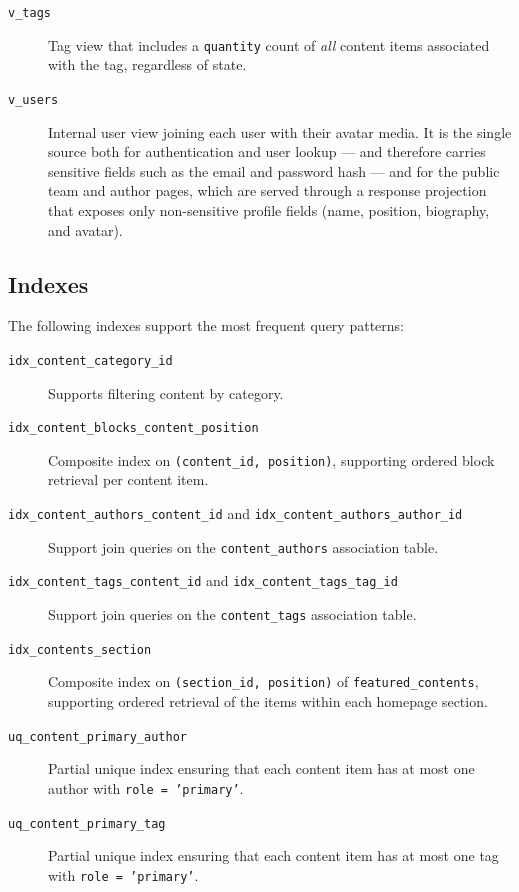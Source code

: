 \begin{description}
      \item[\texttt{v\_tags}] Tag view that includes a \texttt{quantity} count of
            \emph{all} content items associated with the tag, regardless of state.

      \item[\texttt{v\_users}] Internal user view joining each user with their avatar
            media. It is the single source both for authentication and user lookup ---
            and therefore carries sensitive fields such as the email and password hash ---
            and for the public team and author pages, which are served through a response
            projection that exposes only non-sensitive profile fields (name, position,
            biography, and avatar).
\end{description}

\subsection{Indexes} \label{app:dm_indexes}

The following indexes support the most frequent query patterns:

\begin{description}
      \item[\texttt{idx\_content\_category\_id}] Supports filtering content by category.

      \item[\texttt{idx\_content\_blocks\_content\_position}] Composite index on
            \texttt{(content\_id, position)}, supporting ordered block retrieval per
            content item.

      \item[\texttt{idx\_content\_authors\_content\_id} and \texttt{idx\_content\_authors\_author\_id}]
            Support join queries on the \texttt{content\_authors} association table.

      \item[\texttt{idx\_content\_tags\_content\_id} and \texttt{idx\_content\_tags\_tag\_id}]
            Support join queries on the \texttt{content\_tags} association table.

      \item[\texttt{idx\_contents\_section}] Composite index on
            \texttt{(section\_id, position)} of \texttt{featured\_contents}, supporting
            ordered retrieval of the items within each homepage section.

      \item[\texttt{uq\_content\_primary\_author}] Partial unique index ensuring that
            each content item has at most one author with \texttt{role = 'primary'}.

      \item[\texttt{uq\_content\_primary\_tag}] Partial unique index ensuring that
            each content item has at most one tag with \texttt{role = 'primary'}.
\end{description}
